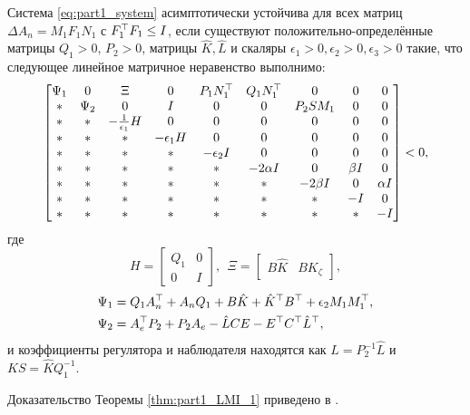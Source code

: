 \begin{theorem}\label{thm:part1_LMI_1}
	Система \eqref{eq:part1_system} асимптотически устойчива для всех матриц $\Delta {A}_n={M}_1{F}_1{N}_1$ с ${F}_1^\top{F}_1\leq {I}$, если существуют положительно-определённые матрицы ${Q}_1>0$, ${P}_2>0$, матрицы $\hat{{K}}, \hat{{L}}$ и скаляры $\epsilon_1>0,\epsilon_2>0,\epsilon_3>0$ такие, что следующее линейное матричное неравенство выполнимо: 
	\begin{equation}
		\label{eq:thm1_final_LMI_ab}
		\begin{bmatrix}    
			{\Psi}_1  & 0 & {\Xi} & 0 &  {P}_1{N}_1^\top & {Q}_1{N}_1^\top & 0 & 0 & 0\\
			* & {\Psi}_2 & 0 & {I} & 0 & 0 & {P}_2{S}{M}_1 & 0 & 0\\
			* & * &  -\frac{1}{\epsilon_1}{H} & 0 & 0 &0 & 0& 0 & 0\\
			* & * & * & -\epsilon_1{H} & 0 & 0 & 0 & 0 & 0 \\
			* & * & * & * & -\epsilon_2 {I} & 0 & 0 & 0 & 0 \\      
			* & * & * & * & *&  -2\alpha {I} & 0 & \beta {I} &0 \\
			* & * & * & * & *& * & -2\beta {I} & 0 & \alpha {I} \\
			* & * & * & * & *&*&* &-{I}&0\\
			* & * & * & * & *&*&*&* &-{I}
		\end{bmatrix} <0,
	\end{equation}
	где
	\begin{equation}
		\label{eq:H_Xi_variables}
		{H} = \begin{bmatrix}
			{Q}_1 & 0 \\
			0 & {I}
		\end{bmatrix}, \ \ 
		{\Xi} = \begin{bmatrix}
			{B}\hat{{K}} & {B}{K}_{\zeta} \end{bmatrix},
	\end{equation}
	\begin{align}
		\label{eq:Psi_1}
		{\Psi}_1&={Q}_1{A}_n^\top+{A}_n{Q}_1+{B}\hat{{K}}+\hat{{K}}^\top{B}^\top  +\epsilon_2{M}_1{M}_1^\top, \\
		\label{eq:Psi_2}
		{\Psi}_2 &={A}_e^\top{P}_2+{P}_2{A}_e-\hat{{L}}{CE}-{E}^\top{C}^\top\hat{{L}}^\top,
	\end{align}
	и коэффициенты регулятора и наблюдателя находятся как ${L}={P}^{-1}_2\hat{{L}}$
	и ${KS}=\hat{{K}}{Q}^{-1}_1$.  
\end{theorem}

Доказательство Теоремы \ref{thm:part1_LMI_1} приведено в \cite{scbib1}.

